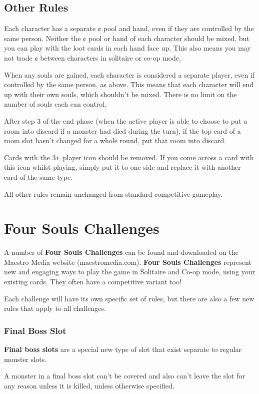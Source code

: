 \documentclass[
  fontsize=10pt,
  paper=a5,
  version=last,
  chapterprefix=true,
  bindingoffset=5mm,
  ]{scrbook}
\def\plus{\texttt{+}}
\begin{document}
    \section{Other Rules}
    Each character has a separate ¢ pool and hand, even if they are controlled by the same person. Neither the ¢ pool or hand of each character should be mixed, but you can play with the loot cards in each hand face up. This also means you may not trade ¢ between characters in solitaire or co-op mode.

    When any souls are gained, each character is considered a separate player, even if controlled by the same person, as above. This means that each character will end up with their own souls, which shouldn’t be mixed. There is no limit on the number of souls each can control.

    After step 3 of the end phase (when the active player is able to choose to put a room into discard if a monster had died during the turn), if the top card of a room slot hasn’t changed for a whole round, put that room into discard.

    Cards with the 3\plus\ player icon should be removed. If you come across a card with this icon whilst playing, simply put it to one side and replace it with another card of the same type.

    All other rules remain unchanged from standard competitive gameplay.

    \chapter{Four Souls Challenges}
    A number of \textbf{Four Souls Challenges} can be found and downloaded on the Maestro Media website (maestromedia.com). \textbf{Four Souls Challenges} represent new and engaging ways to play the game in Solitaire and Co-op mode, using your existing cards. They often have a competitive variant too!

    Each challenge will have its own specific set of rules, but there are also a few new rules that apply to all challenges.

    \subsection*{Final Boss Slot}
    \textbf{Final boss slots} are a special new type of slot that exist separate to regular monster slots.

    A monster in a final boss slot can’t be covered and also can’t leave the slot for any reason unless it is killed, unless otherwise specified.
\end{document}
